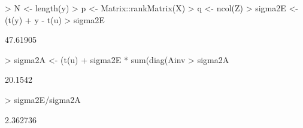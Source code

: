 \documentclass[12pt,a4paper]{paper}
\begin{document}
\begin{enumerate}
\begin{Schunk}
\begin{Sinput}
> N <- length(y)
> p <- Matrix::rankMatrix(X)
> q <- ncol(Z)
> sigma2E <-(t(y) %*% y - t(beta) %*% t(X) %*% 
+              y - t(u) %*% t(Z) %*% y) / as.numeric(N - p)
> sigma2E
\end{Sinput}
\begin{Soutput}
         [,1]
[1,] 47.61905
\end{Soutput}
\begin{Sinput}
> sigma2A <- (t(u) %*% Ainv %*% u + 
+               sigma2E * sum(diag(Ainv %*% solve(C22))))/q
> sigma2A
\end{Sinput}
\begin{Soutput}
        [,1]
[1,] 20.1542
\end{Soutput}
\begin{Sinput}
> sigma2E/sigma2A
\end{Sinput}
\begin{Soutput}
         [,1]
[1,] 2.362736
\end{Soutput}
\end{Schunk}
\end{enumerate}
\end{document}
